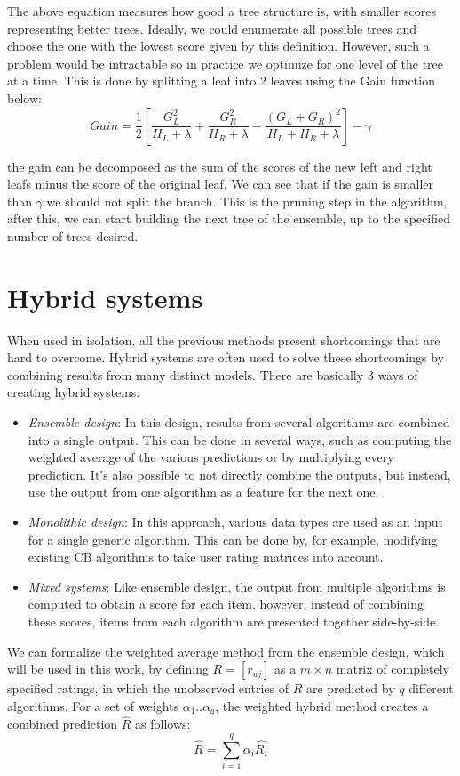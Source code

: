 \documentclass[cic,tc,english]{iiufrgs}
\newcommand{\adriano}[1]{#1}
\begin{document}
\adriano{The above equation measures how good a tree structure is, with smaller scores representing better trees. Ideally, we could enumerate all possible trees and choose the one with the lowest score given by this definition. However, such a problem would be intractable so in practice we optimize for one level of the tree at a time. This is done by splitting a leaf into 2 leaves using the Gain function below:}
$$
Gain = \frac{1}{2} \left[\frac{G_L^2}{H_L+\lambda}+\frac{G_R^2}{H_R+\lambda}-\frac{(G_L+G_R)^2}{H_L+H_R+\lambda}\right] - \gamma
$$

\noindent the gain can be decomposed as the sum of the scores of the new left and right leafs minus the score of the original leaf. We can see that if the gain is smaller than $\gamma$ we should not split the branch. This is the pruning step in the algorithm, after this, we can start building the next tree of the ensemble, up to the specified number of trees desired.

\section{Hybrid systems}
When used in isolation, all the previous methods present shortcomings that are hard to overcome. Hybrid systems are often used to solve these shortcomings by combining results from many distinct models. There are basically 3 ways of creating hybrid systems:
\begin{itemize}
\item \emph{Ensemble design}: In this design, results from several algorithms are combined into a single output. This can be done in several ways, such as computing the weighted average of the various predictions or by multiplying every prediction. It's also possible to not directly combine the outputs, but instead, use the output from one algorithm as a feature for the next one.
\item \emph{Monolithic design}: In this approach, various data types are used as an input for a single generic algorithm. This can be done by, for example, modifying existing CB algorithms to take user rating matrices into account.
\item \emph{Mixed systems}: Like ensemble design, the output from multiple algorithms is computed to obtain a score for each item, however, instead of combining these scores, items from each algorithm are presented together side-by-side.
\end{itemize}

We can formalize the weighted average method from the ensemble design, which will be used in this work, by defining $R = [r_{uj}]$ as a $m \times n$ matrix of completely specified ratings, in which the unobserved entries of $R$ are predicted by $q$ different algorithms. For a set of weights $\alpha_1 .. \alpha_q$, the weighted hybrid method creates a combined prediction $\hat{R}$ as follows:
$$
\hat{R} = \sum_{i=1}^{q}{\alpha_i\hat{R_i}}
$$
\end{document}
